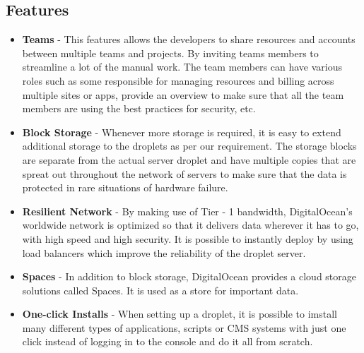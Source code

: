 \documentclass[../thesis.tex]{subfiles}
\begin{document}
\subsection*{Features}
\begin{itemize}
	\item \textbf{Teams} - This features allows the developers to share resources and accounts between multiple teams and projects. By inviting teams members to streamline a lot of the manual work. The team members can have various roles such as some responsible for managing resources and billing across multiple sites or apps, provide an overview to make sure that all the team members are using the best practices for security, etc.
	\newline
    
	\item \textbf{Block Storage} - Whenever more storage is required, it is easy to extend additional storage to the droplets as per our requirement. The storage blocks are separate from the actual server droplet and have multiple copies that are spreat out throughout the network of servers to make sure that the data is protected in rare situations of hardware failure.
	\newline
    
	\item \textbf{Resilient Network} - By making use of Tier - 1 bandwidth, DigitalOcean's worldwide network is optimized so that it delivers data wherever it has to go, with high speed and high security. It is possible to instantly deploy by using load balancers which improve the reliability of the droplet server.
	\newline
    
	\item \textbf{Spaces} - In addition to block storage, DigitalOcean provides a cloud storage solutions called Spaces. It is used as a store for important data.
	\newline
    
	\item \textbf{One-click Installs} - When setting up a droplet, it is possible to imstall many different types of applications, scripts or CMS systems with just one click instead of logging in to the console and do it all from scratch.
	\newline
    
	
\end{itemize}
\end{document}
